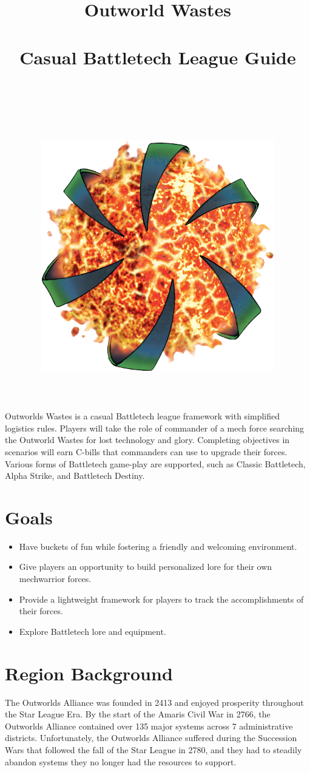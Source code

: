 \documentclass[UTF8]{article}
\title{
  Outworld Wastes\\
  ~\\
  \large Casual Battletech League Guide \\
  ~\\
  ~\\
  ~\\
  \includegraphics[width=4in]{../img/Outworlds-Alliance.png}
}
\author{}
\date{}
\begin{document}
\maketitle

\newpage

Outworlds Wastes is a casual Battletech league framework with simplified logistics rules.
Players will take the role of commander of a mech force searching the Outworld Wastes for lost technology and glory.
Completing objectives in scenarios will earn C-bills that commanders can use to upgrade their forces.
Various forms of Battletech game-play are supported, such as Classic Battletech, Alpha Strike, and Battletech Destiny.\\

\section*{Goals}

\begin{itemize}

\item Have buckets of fun while fostering a friendly and welcoming environment.

\item Give players an opportunity to build personalized lore for their own mechwarrior forces.

\item Provide a lightweight framework for players to track the accomplishments of their forces.

\item Explore Battletech lore and equipment.

\end{itemize}

\newpage

\section{Region Background}

The Outworlds Alliance was founded in 2413 and enjoyed prosperity throughout the Star League Era.
By the start of the Amaris Civil War in 2766, the Outworlds Alliance contained over 135 major systems across 7 administrative districts.
Unfortunately, the Outworlds Alliance suffered during the Succession Wars that followed the fall of the Star League in 2780, and they had to steadily abandon systems they no longer had the resources to support.\\
\end{document}
